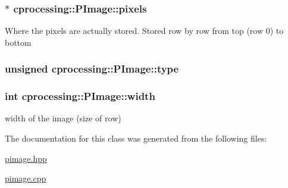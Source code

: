 \hypertarget{classcprocessing_1_1PImage_a6c411ebe0b1bb92e0e17a3e5ffaf7bf0}{
\subsubsection[{pixels}]{$\ast$ {\bf cprocessing\-::\-P\-Image\-::pixels}}}\label{classcprocessing_1_1PImage_a6c411ebe0b1bb92e0e17a3e5ffaf7bf0}
\-Where the pixels are actually stored. \-Stored row by row from top (row 0) to bottom \hypertarget{classcprocessing_1_1PImage_a465d1a7c776bc7735cc5bdb4dca20586}{
\subsubsection[{type}]{\setlength{\rightskip}{0pt plus 5cm}unsigned {\bf cprocessing\-::\-P\-Image\-::type}}}\label{classcprocessing_1_1PImage_a465d1a7c776bc7735cc5bdb4dca20586}
\hypertarget{classcprocessing_1_1PImage_a784b1e16d4ccfa218e8cf430ea6ca5ea}{
\subsubsection[{width}]{\setlength{\rightskip}{0pt plus 5cm}int {\bf cprocessing\-::\-P\-Image\-::width}}}\label{classcprocessing_1_1PImage_a784b1e16d4ccfa218e8cf430ea6ca5ea}


width of the image (size of row) 



\-The documentation for this class was generated from the following files\-:\begin{DoxyCompactItemize}
\item 
\hyperlink{pimage_8hpp}{pimage.\-hpp}\item 
\hyperlink{pimage_8cpp}{pimage.\-cpp}\end{DoxyCompactItemize}
